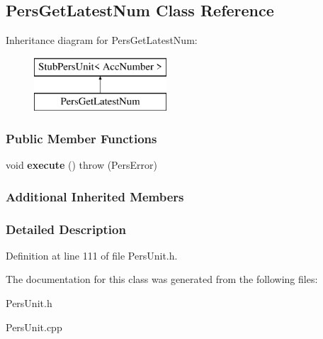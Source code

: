 \hypertarget{classPersGetLatestNum}{\subsection{Pers\-Get\-Latest\-Num Class Reference}
\label{df/dec/classPersGetLatestNum}
}
Inheritance diagram for Pers\-Get\-Latest\-Num\-:\begin{figure}[H]
\begin{center}
\leavevmode
\includegraphics[height=2.000000cm]{df/dec/classPersGetLatestNum}
\end{center}
\end{figure}
\subsubsection*{Public Member Functions}
\begin{DoxyCompactItemize}
\item 
\hypertarget{classPersGetLatestNum_adf7f74e302ac82728b168e28d973ea3e}{void {\bfseries execute} ()  throw (\-Pers\-Error)}\label{df/dec/classPersGetLatestNum_adf7f74e302ac82728b168e28d973ea3e}

\end{DoxyCompactItemize}
\subsubsection*{Additional Inherited Members}


\subsubsection{Detailed Description}


Definition at line 111 of file Pers\-Unit.\-h.



The documentation for this class was generated from the following files\-:\begin{DoxyCompactItemize}
\item 
Pers\-Unit.\-h\item 
Pers\-Unit.\-cpp\end{DoxyCompactItemize}
